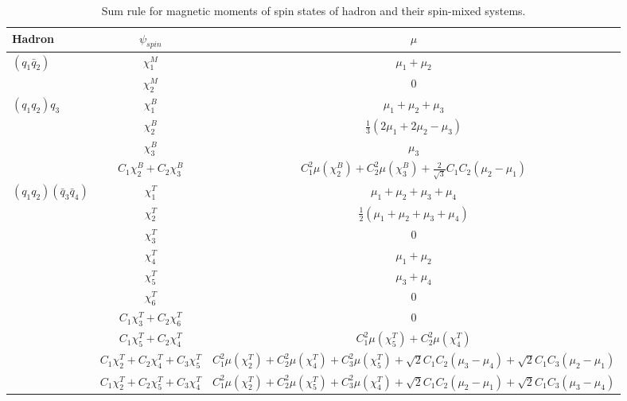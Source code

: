 \documentclass[prd,twocolumn,floatfix,nofootinbib]{revtex4}
\begin{document}
\begin{table}[!htb]
\caption{Sum rule for magnetic moments of spin states of hadron and their
spin-mixed systems.}
\label{tab:musum}%
\begin{tabular}{lcc}
\hline\hline
\textrm{Hadron} & $\psi_{spin}$ & $\mu$ \\ \hline
$\left(q_{1}{\bar{q}}_{2}\right)$ & $\chi_{1}^{M}$ & $\mu_{1}+\mu_{2}$ \\
& $\chi_{2}^{M}$ & 0 \\
$\left(q_{1}q_{2}\right)q_{3}$ & $\chi_{1}^{B}$ & $\mu_{1}+\mu_{2}+\mu_{3}$
\\
& $\chi_{2}^{B}$ & $\frac{1}{3}\left(2\mu_{1}+2\mu_{2}-\mu_{3}\right)$ \\
& $\chi_{3}^{B}$ & $\mu_{3}$ \\
& $C_{1}\chi_{2}^{B}+C_{2}\chi_{3}^{B}$ & $C_{1}^{2}\mu\left(\chi_{2}^{B}%
\right) + C_{2}^{2}\mu\left(\chi_{3}^{B}\right) + \frac{2}{\sqrt{3}}%
C_{1}C_{2}\left(\mu_{2}-\mu_{1}\right)$ \\
$\left(q_{1}q_{2}\right)\left({\bar{q}}_{3}{\bar{q}}_{4}\right)$ & $%
\chi_{1}^{T}$ & $\mu_{1}+\mu_{2}+\mu_{3}+\mu_{4}$ \\
& $\chi_{2}^{T}$ & $\frac{1}{2}\left(\mu_{1}+\mu_{2}+\mu_{3}+\mu_{4}\right)$
\\
& $\chi_{3}^{T}$ & 0 \\
& $\chi_{4}^{T}$ & $\mu_{1}+\mu_{2}$ \\
& $\chi_{5}^{T}$ & $\mu_{3}+\mu_{4}$ \\
& $\chi_{6}^{T}$ & 0 \\
& $C_{1}\chi_{3}^{T}+C_{2}\chi_{6}^{T}$ & 0 \\
& $C_{1}\chi_{5}^{T}+C_{2}\chi_{4}^{T}$ & $C_{1}^{2}\mu\left(\chi_{5}^{T}%
\right) + C_{2}^{2}\mu\left(\chi_{4}^{T}\right)$ \\
& $C_{1}\chi_{2}^{T}+C_{2}\chi_{4}^{T}+C_{3}\chi_{5}^{T}$ & $%
C_{1}^{2}\mu\left(\chi_{2}^{T}\right) +
C_{2}^{2}\mu\left(\chi_{4}^{T}\right) +
C_{3}^{2}\mu\left(\chi_{5}^{T}\right) + \sqrt{2}C_{1}C_{2}\left(\mu_{3}-%
\mu_{4}\right) + \sqrt{2}C_{1}C_{3}\left(\mu_{2}-\mu_{1}\right)$ \\
& $C_{1}\chi_{2}^{T}+C_{2}\chi_{5}^{T}+C_{3}\chi_{4}^{T}$ & $%
C_{1}^{2}\mu\left(\chi_{2}^{T}\right) +
C_{2}^{2}\mu\left(\chi_{5}^{T}\right) +
C_{3}^{2}\mu\left(\chi_{4}^{T}\right) + \sqrt{2}C_{1}C_{2}\left(\mu_{2}-%
\mu_{1}\right) + \sqrt{2}C_{1}C_{3}\left(\mu_{3}-\mu_{4}\right)$ \\
\hline\hline
\end{tabular}%
\end{table}
\end{document}
